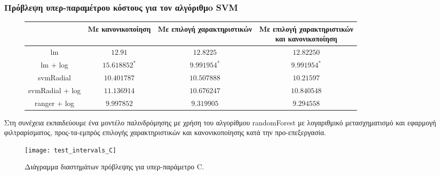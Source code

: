 \subsubsection{Πρόβλεψη υπερ-παραμέτρου κόστους για τον αλγόριθμo \gls{SVM} }
\begin{figure}[!htb]
	\footnotesize
	\begin{center}
		\begin{tabular}{ |c|c|c|c| } 
			\hline
			& Με κανονικοποίηση & Με επιλογή χαρακτηριστικών & \pbox{20cm}{Με επιλογή χαρακτηριστικών\\ και κανονικοποίηση} \\
			\hline
			lm & $12.91$  & $12.8225$ & $12.82250$  \\
			\hline
			lm + log & $15.618852^*$ & $9.991954 ^{*}$& $9.991954^*$ \\
			\hline
			svmRadial & $10.401787$ &$10.507888$& $10.21597$\\
			\hline
			svmRadial + log& $11.136914$ & $10.676247$& $10.840548$\\
			\hline
			ranger + log  & $9.997852$ & $9.319905$ & $9.294558$\\
			\hline
		\end{tabular}   
	\end{center}
\end{figure}

Στη συνέχεια εκπαιδεύουμε ένα μοντέλο παλινδρόμησης με χρήση του αλγορίθμου randomForest με λογαριθμικό μετασχηματισμό και εφαρμογή φιλτραρίσματος, προς-τα-εμπρός επιλογής χαρακτηριστικών και κανονικοποίησης κατά την προ-επεξεργασία.

\begin{figure} [!htb]
	\texttt{[image: test\_intervals\_C]}
		\caption[Διάγραμμα διαστημάτων πρόβλεψης για υπερ-παράμετρο decay]{Διάγραμμα διαστημάτων πρόβλεψης για υπερ-παράμετρο C.}
	\label{fig:high} 
\end{figure}
\FloatBarrier
